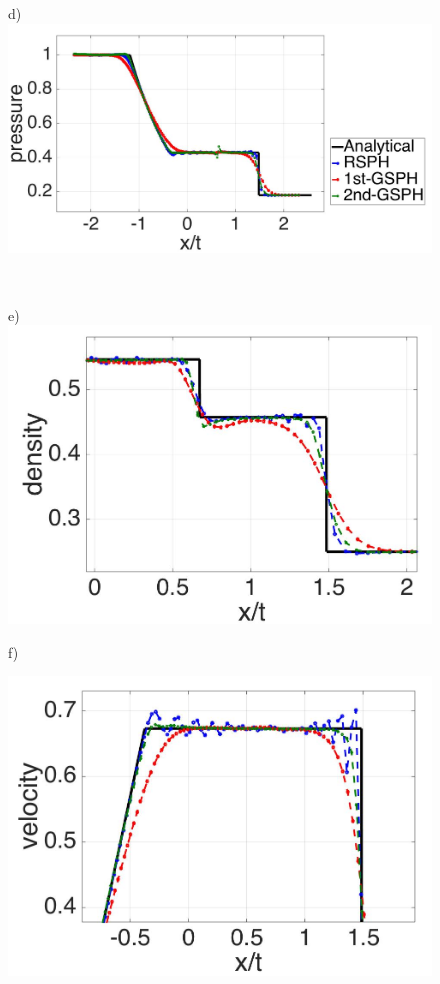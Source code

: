 \documentclass[preprint,12pt,authoryear]{elsarticle}
\begin{document}
\begin{figure}[H]
\begin{minipage}{.45\textwidth}
    \end{minipage}%
    \begin{minipage}{.545 \textwidth}
        \centering d)
        \includegraphics[width=0.99 \textwidth,height=0.4954\textwidth]{./Figures/RCM-Sod-GSPH2-compare-p}
    \end{minipage}%
    \\
    \begin{minipage}{.45\textwidth}
        \centering e)
        \includegraphics[width=0.99 \textwidth,height=0.6\textwidth]{./Figures/RCM-Sod-GSPH2-compare-rho-zoom}
    \end{minipage}%
    \begin{minipage}{.545\textwidth}
    \centering f)
        \begin{flushleft}
        \includegraphics[width= 0.8174 \textwidth, height=0.4954 \textwidth]{./Figures/RCM-Sod-GSPH2-compare-v-zoom}    

\end{flushleft}
\end{minipage}
\end{figure}
\end{document}

